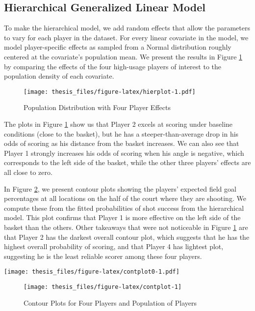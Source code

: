 \documentclass[12pt,twoside]{dukestatscithesis}
\theoremstyle{definition}
\theoremstyle{definition}
\theoremstyle{definition}
\theoremstyle{remark}
\begin{document}
\subsection{Hierarchical Generalized Linear
Model}\label{hierarchical-generalized-linear-model-1}

To make the hierarchical model, we add random effects that allow the
parameters to vary for each player in the dataset. For every linear
covariate in the model, we model player-specific effects as sampled from
a Normal distribution roughly centered at the covariate's population
mean. We present the results in Figure \ref{fig:hierplot} by comparing
the effects of the four high-usage players of interest to the population
density of each covariate.

\pagebreak
\begin{figure}[htbp]
\centering
\texttt{[image: thesis\_files/figure-latex/hierplot-1.pdf]}
\caption{\label{fig:hierplot}Population Distribution with Four Player
Effects}
\end{figure}
The plots in Figure \ref{fig:hierplot} show us that Player 2 excels at
scoring under baseline conditions (close to the basket), but he has a
steeper-than-average drop in his odds of scoring as his distance from
the basket increases. We can also see that Player 1 strongly increases
his odds of scoring when his angle is negative, which corresponds to the
left side of the basket, while the other three players' effects are all
close to zero.

In Figure \ref{fig:contplot}, we present contour plots showing the
players' expected field goal percentages at all locations on the half of
the court where they are shooting. We compute these from the fitted
probabilities of shot success from the hierarchical model. This plot
confirms that Player 1 is more effective on the left side of the basket
than the others. Other takeaways that were not noticeable in Figure
\ref{fig:hierplot} are that Player 2 has the darkest overall contour
plot, which suggests that he has the highest overall probability of
scoring, and that Player 4 has lightest plot, suggesting he is the least
reliable scorer among these four players.

\texttt{[image: thesis\_files/figure-latex/contplot0-1.pdf]}
\begin{figure}

\hfill{}\texttt{[image: thesis\_files/figure-latex/contplot-1]} 

\caption{Contour Plots for Four Players and Population of Players}\label{fig:contplot}
\end{figure}
\end{document}
